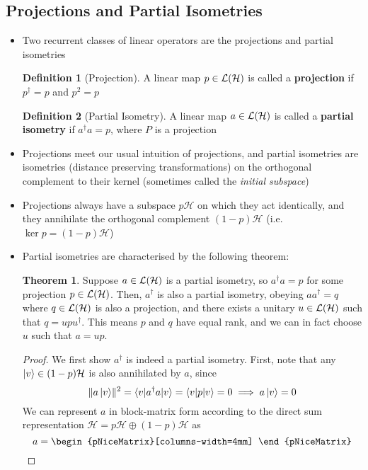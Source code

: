 \documentclass[12pt,a4paper]{article}
\numberwithin{equation}{section}
\theoremstyle{definition}
\newtheorem{definition}{Definition}[section]
\theoremstyle{theorem}
\newtheorem{theorem}{Theorem}[section]
\begin{document}
	\subsection{Projections and Partial Isometries}
	\begin{itemize}
		\item Two recurrent classes of linear operators are the projections and partial isometries
		\begin{definition}[Projection]
			A linear map $p\in\mathcal{L}(\mathcal{H})$ is called a \textbf{projection} if $p^{\dagger}=p$ and $p^{2}=p$
		\end{definition}
		\begin{definition}[Partial Isometry]
			A linear map $a\in\mathcal{L}(\mathcal{H})$ is called a \textbf{partial isometry} if $a^{\dagger}a=p$, where $P$ is a projection
		\end{definition}
		\item Projections meet our usual intuition of projections, and partial isometries are isometries (distance preserving transformations) on the orthogonal complement to their kernel (sometimes called the \textit{initial subspace})
		\item Projections always have a subspace $p\mathcal{H}$ on which they act identically, and they annihilate the orthogonal complement $(1-p)\mathcal{H}$ (i.e. $\ker{p}=(1-p)\mathcal{H}$)
		\item Partial isometries are characterised by the following theorem:
		\begin{theorem}
			Suppose $a\in\mathcal{L}(\mathcal{H})$ is a partial isometry, so $a^{\dagger}a=p$ for some projection $p\in\mathcal{L}(\mathcal{H})$. Then, $a^{\dagger}$ is also a partial isometry, obeying $aa^{\dagger}=q$ where $q\in\mathcal{L}(\mathcal{H})$ is also a projection, and there exists a unitary $u\in\mathcal{L}(\mathcal{H})$ such that $q=upu^{\dagger}$. This means $p$ and $q$ have equal rank, and we can in fact choose $u$ such that $a=up$.
		\end{theorem}
		\begin{proof}
			We first show $a^{\dagger}$ is indeed a partial isometry. First, note that any $\ket{v}\in (1-p)\mathcal{H}$ is also annihilated by $a$, since 
			\begin{equation} 
				\lVert a\ket{v}\rVert^{2} =\braket{v|a^{\dagger}a|v}=\braket{v|p|v}=0 \implies a\ket{v}=0
			\end{equation} 
			We can represent $a$ in block-matrix form according to the direct sum representation $\mathcal{H}=p\mathcal{H}\oplus(1-p)\mathcal{H}$ as
			\begin{equation}
				a=\begin{pNiceMatrix}[columns-width=4mm]

\end{pNiceMatrix}
\end{equation}
\end{proof}
\end{itemize}
\end{document}
